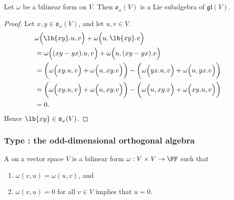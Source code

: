 \documentclass{article}
\DeclarePairedDelimiter\lb\lbrack\rbrack
\newcommand*\gl{\ensuremath{\mathfrak{gl}}}
\newcommand*\oalg{\ensuremath{\mathfrak{o}}}
\newcommand*\acts{.}
\begin{document}
\begin{theorem}
    Let $\omega$ be a bilinear form on $V$. 
    Then $\oalg_\omega(V)$ is a Lie subalgebra of $\gl(V)$.
\end{theorem}
\begin{proof}
    Let $x, y \in \oalg_\omega(V)$, and let $u, v \in V$.
    \begin{align*}
        &\omega\Big(
            \lb{xy} \acts u, v
        \Big)
        +
        \omega\Big(
            u, \lb{xy} \acts v
        \Big)
        \\
        &=
        \omega\Big(
            (xy - yx) \acts u, v
        \Big)
        +
        \omega\Big(
            u, (xy - yx) \acts v
        \Big)
        \\
        &=
        \bigg(
            \omega\Big(
                xy \acts u, v
            \Big)
            +
            \omega\Big(
                u, xy \acts v
            \Big)
        \bigg)
        -
        \bigg(
            \omega\Big(
                yx \acts u, v
            \Big)
            +
            \omega\Big(
                u, yx \acts v
            \Big)
        \bigg)
        \\
        &=
        \bigg(
            \omega\Big(
                xy \acts u, v
            \Big)
            +
            \omega\Big(
                u, xy \acts v
            \Big)
        \bigg)
        -
        \bigg(
            \omega\Big(
                u, xy \acts v
            \Big)
            +
            \omega\Big(
                xy \acts u, v
            \Big)
        \bigg)
        \\
        &=
        0.
    \end{align*}
    Hence $\lb{xy} \in \oalg_\omega(V)$.
\end{proof}


\subsubsection{Type \sfB: the odd-dimensional orthogonal algebra}

\begin{definition}
    A  on a vector space $V$ is a bilinear form $\omega: V \times V \to \FF$ such that
    \begin{enumerate}[label=(\alph*)]
        \item 
            $\omega(v,u) = \omega(u,v)$, and
        \item 
            $\omega(v,u) = 0$ for all $v \in V$ implies that $u=0$.
    \end{enumerate}
\end{definition}
\end{document}
